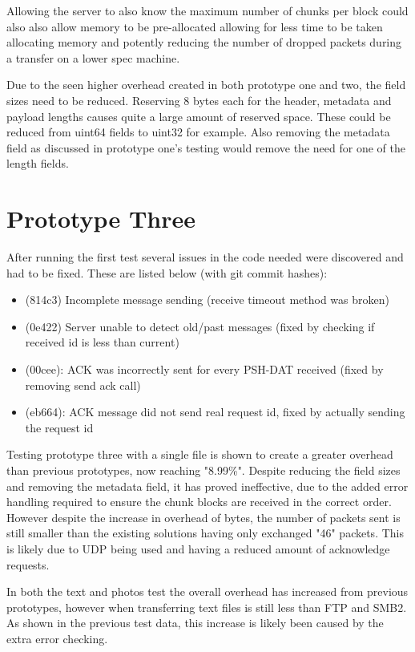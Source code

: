 Allowing the server to also know the maximum number of chunks per block could also also allow memory to be pre-allocated allowing for less time to be taken allocating memory and potently reducing the number of dropped packets during a transfer on a lower spec machine.

Due to the seen higher overhead created in both prototype one and two, the field sizes need to be reduced. Reserving 8 bytes each for the header, metadata and payload lengths causes quite a large amount of reserved space. These could be reduced from uint64 fields to uint32 for example. Also removing the metadata field as discussed in prototype one's testing would remove the need for one of the length fields.


\section{Prototype Three}
After running the first test several issues in the code needed were discovered and had to be fixed. These are listed below (with git commit hashes):

\begin{itemize}
    \item (814c3) Incomplete message sending (receive timeout method was broken)
    \item (0e422) Server unable to detect old/past messages (fixed by checking if received id is less than current)
    \item (00cee): ACK was incorrectly sent for every PSH-DAT received (fixed by removing send ack call)
    \item (eb664): ACK message did not send real request id, fixed by actually sending the request id
\end{itemize}

Testing prototype three with a single file is shown to create a greater overhead than previous prototypes, now reaching "8.99\%". Despite reducing the field sizes and removing the metadata field, it has proved ineffective, due to the added error handling required to ensure the chunk blocks are received in the correct order. However despite the increase in overhead of bytes, the number of packets sent is still smaller than the existing solutions having only exchanged "46" packets. This is likely due to UDP being used and having a reduced amount of acknowledge requests.

In both the text and photos test the overall overhead has increased from previous prototypes, however when transferring text files is still less than FTP and SMB2. As shown in the previous test data, this increase is likely been caused by the extra error checking.

